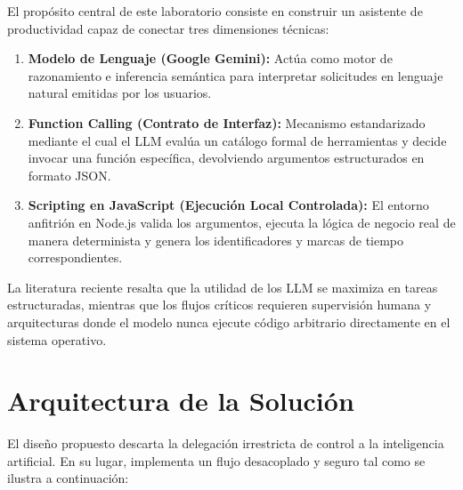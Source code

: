 \documentclass[11pt,a4paper]{article}
\begin{document}
El propósito central de este laboratorio consiste en construir un asistente de productividad capaz de conectar tres dimensiones técnicas:
\begin{enumerate}
    \item \textbf{Modelo de Lenguaje (Google Gemini):} Actúa como motor de razonamiento e inferencia semántica para interpretar solicitudes en lenguaje natural emitidas por los usuarios.
    \item \textbf{Function Calling (Contrato de Interfaz):} Mecanismo estandarizado mediante el cual el LLM evalúa un catálogo formal de herramientas y decide invocar una función específica, devolviendo argumentos estructurados en formato JSON.
    \item \textbf{Scripting en JavaScript (Ejecución Local Controlada):} El entorno anfitrión en Node.js valida los argumentos, ejecuta la lógica de negocio real de manera determinista y genera los identificadores y marcas de tiempo correspondientes.
\end{enumerate}

La literatura reciente resalta que la utilidad de los LLM se maximiza en tareas estructuradas, mientras que los flujos críticos requieren supervisión humana y arquitecturas donde el modelo nunca ejecute código arbitrario directamente en el sistema operativo.

\section{Arquitectura de la Solución}

El diseño propuesto descarta la delegación irrestricta de control a la inteligencia artificial. En su lugar, implementa un flujo desacoplado y seguro tal como se ilustra a continuación:
\end{document}
